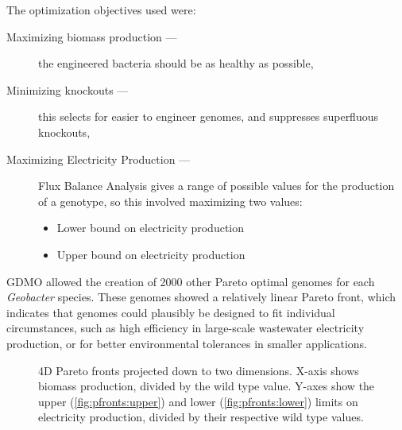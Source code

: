 \documentclass[a4paper,11pt]{article}
\begin{document}
The optimization objectives used were:
\begin{description}
	\item[Maximizing biomass production ---] the engineered bacteria should be as healthy as possible,
	\item[Minimizing knockouts ---] this selects for easier to engineer genomes, and suppresses superfluous knockouts,
	\item[Maximizing Electricity Production ---] Flux Balance Analysis gives a range of possible values for the production of a genotype, so this involved maximizing two values:
	\begin{itemize}
		\item Lower bound on electricity production
		\item Upper bound on electricity production
	\end{itemize}
\end{description}

GDMO allowed the creation of 2000 other Pareto optimal genomes for each {\it Geobacter} species. These genomes showed a relatively linear Pareto front, which indicates that genomes could plausibly be designed to fit individual circumstances, such as high efficiency in large-scale wastewater electricity production, or for better environmental tolerances in smaller applications.

\begin{figure}[!htb]
	\caption{4D Pareto fronts projected down to two dimensions. X-axis shows biomass production, divided by the wild type value. Y-axes show the upper (\ref{fig:pfronts:upper}) and lower (\ref{fig:pfronts:lower}) limits on electricity production, divided by their respective wild type values. \label{fig:pfronts}}
\end{figure}
\end{document}
